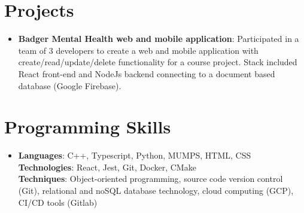 \documentclass[letterpaper,11pt]{article}
\makeatletter
\newcommand{\resumeItem}[2]{
  \item\small{
    \textbf{#1}{: #2 \vspace{-2pt}}
  }
}
\newcommand{\resumeSubSubheading}[2]{
    \begin{tabular*}{0.97\textwidth}{l@{\extracolsep{\fill}}r}
      \textit{\small#1} & \textit{\small #2} \\
    \end{tabular*}\vspace{-5pt}
}
\newcommand{\resumeSubItem}[2]{\resumeItem{#1}{#2}\vspace{-4pt}}
\newcommand{\resumeSubHeadingListStart}{\begin{itemize}[leftmargin=*]}
\newcommand{\resumeSubHeadingListEnd}{\end{itemize}}
\newcommand{\resumeItemListStart}{\begin{itemize}}
\newcommand{\resumeItemListEnd}{\end{itemize}\vspace{-5pt}}
\makeatother
\begin{document}

\section{Projects}
  \resumeSubHeadingListStart
    \resumeSubItem{Badger Mental Health web and mobile application}
      {Participated in a team of 3 developers to create a web and mobile application with create/read/update/delete functionality for a course project. Stack included React front-end and NodeJs backend connecting to a document based database (Google Firebase).}
  \resumeSubHeadingListEnd

%

\section{Programming Skills}
  \resumeSubHeadingListStart
    \item{
      \textbf{Languages}{: C++, Typescript, Python, MUMPS, HTML, CSS} \\
      \textbf{Technologies}{: React, Jest, Git, Docker, CMake} \\
      \textbf{Techniques}{: Object-oriented programming, source code version control (Git), relational and noSQL database technology, cloud computing (GCP), CI/CD tools (Gitlab)}
    }
  \resumeSubHeadingListEnd

\end{document}

